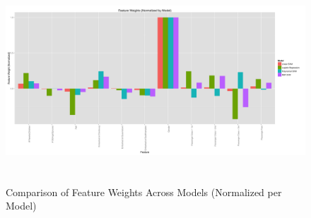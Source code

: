 \documentclass[10pt]{article}
\begin{document}
\begin{figure}[ht]
	\centering
	\includegraphics[height=3in]{titanic_weight_comparison.png}
	\caption*{Comparison of Feature Weights Across Models (Normalized per Model)}
\end{figure}
\end{document}
